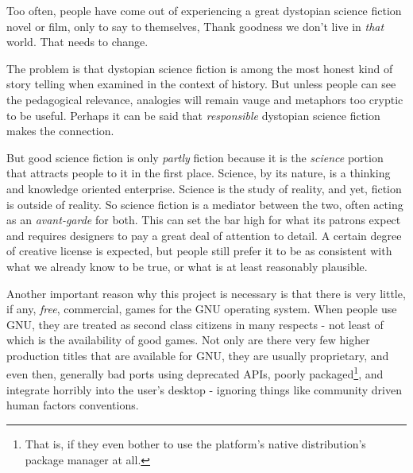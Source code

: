 

Too often, people have come out of experiencing a great dystopian science fiction novel or film, only to say to themselves, Thank goodness we don't live in {\it that} world. That needs to change.

The problem is that dystopian science fiction is among the most honest kind of story telling when examined in the context of history. But unless people can see the pedagogical relevance, analogies will remain vauge and metaphors too cryptic to be useful. Perhaps it can be said that {\it responsible} dystopian science fiction makes the connection.

But good science fiction is only {\it partly} fiction because it is the {\it science} portion that attracts people to it in the first place. Science, by its nature, is a thinking and knowledge oriented enterprise. Science is the study of reality, and yet, fiction is outside of reality. So science fiction is a mediator between the two, often acting as an {\it avant-garde} for both.
    {}
This can set the bar high for what its patrons expect and requires designers to pay a great deal of attention to detail. A certain degree of creative license is expected, but people still prefer it to be as consistent with what we already know to be true, or what is at least reasonably plausible.

Another important reason why this project is necessary is that there is very little, if any, {\it free}, commercial, games for the GNU operating system. When people use GNU, they are treated as second class citizens in many respects - not least of which is the availability of good games. Not only are there very few higher production titles that are available for GNU, they are usually proprietary, and even then, generally bad ports using deprecated APIs, poorly packaged\footnote{That is, if they even bother to use the platform's native distribution's package manager at all.}, and integrate horribly into the user's desktop - ignoring things like community driven human factors conventions.

